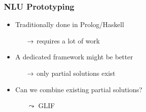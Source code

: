 



\begin{frame}
    \frametitle{NLU Prototyping}
    \begin{itemize}
        \item Traditionally done in Prolog/Haskell
        \begin{itemize}
            \item[$\rightarrow$] requires a lot of work
        \end{itemize}
            \item A dedicated framework might be better
        \begin{itemize}
            \item[$\rightarrow$] only partial solutions exist
        \end{itemize}
        \item Can we combine existing partial solutions?
        \begin{itemize}
            \item[$\leadsto$] GLIF
        \end{itemize}
    \end{itemize}
\end{frame}


